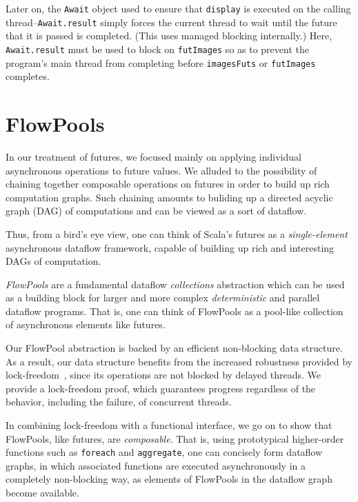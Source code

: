 Later on, the \verb|Await| object used to ensure that \verb|display| is executed
on the calling thread--\verb|Await.result| simply forces the current thread to
wait until the future that it is passed is completed. (This uses managed
blocking internally.) Here, \verb|Await.result| must be used to block on
\verb|futImages| so as to prevent the program's main thread from completing
before \verb|imagesFuts| or \verb|futImages| completes.


\section{FlowPools}
\label{sec:flowpools}

In our treatment of futures, we focused mainly on applying individual
asynchronous operations to future values. We alluded to the possibility of
chaining together composable operations on futures in order to build up rich
computation graphs. Such chaining amounts to buliding up a directed acyclic
graph (DAG) of computations and can be viewed as a sort of dataflow.

Thus, from a bird's eye view, one can think of Scala's futures as a {\em
single-element} asynchronous dataflow framework, capable of building up rich and
interesting DAGs of computation.

{\em FlowPools} are a fundamental dataflow {\em collections} abstraction which
can be used as a building block for larger and more complex
\textit{deterministic} and parallel dataflow programs. That is, one can think of
FlowPools as a pool-like collection of asynchronous elements like futures.

Our FlowPool abstraction is backed by an efficient non-blocking data structure.
As a result, our data structure benefits from the increased robustness
provided by lock-freedom~\cite{Herlihy90}, since its operations are not blocked
by delayed threads. We provide a lock-freedom proof, which guarantees progress
regardless of the behavior, including the failure, of concurrent threads.

In combining lock-freedom with a functional interface, we go on to show that
FlowPools, like futures, are \textit{composable}. That is, using prototypical
higher-order functions such as \verb=foreach= and \verb=aggregate=, one can
concisely form dataflow graphs, in which associated functions are executed
asynchronously in a completely non-blocking way, as elements of FlowPools in the
dataflow graph become available.


